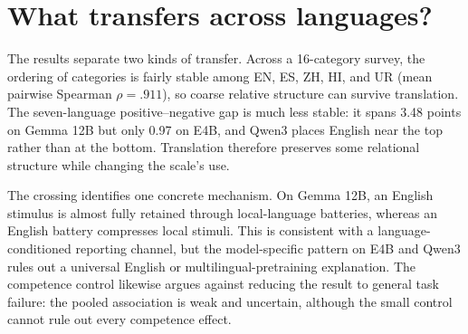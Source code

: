 \documentclass{article}
\begin{document}
\section{What transfers across languages?}

The results separate two kinds of transfer. Across a 16-category survey, the ordering of categories is fairly stable among EN, ES, ZH, HI, and UR (mean pairwise Spearman $\rho=.911$), so coarse relative structure can survive translation. The seven-language positive--negative gap is much less stable: it spans 3.48 points on Gemma 12B but only 0.97 on E4B, and Qwen3 places English near the top rather than at the bottom. Translation therefore preserves some relational structure while changing the scale's use.

The crossing identifies one concrete mechanism. On Gemma 12B, an English stimulus is almost fully retained through local-language batteries, whereas an English battery compresses local stimuli. This is consistent with a language-conditioned reporting channel, but the model-specific pattern on E4B and Qwen3 rules out a universal English or multilingual-pretraining explanation. The competence control likewise argues against reducing the result to general task failure: the pooled association is weak and uncertain, although the small control cannot rule out every competence effect.




\end{document}
